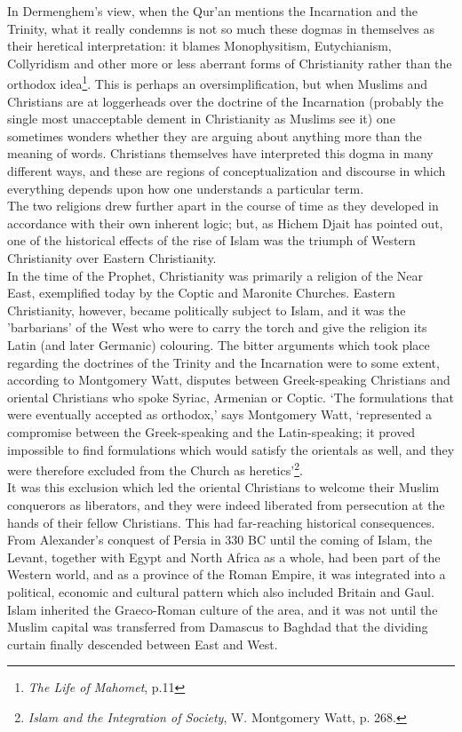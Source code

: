 \documentclass[10pt, twoside,openright]{book}
\begin{document}
In Dermenghem's view, when the Qur'an mentions the Incarnation and the Trinity, what it really 
condemns is not so much these dogmas in themselves as their heretical interpretation: it blames 
Monophysitism, Eutychianism, Collyridism and other more or less aberrant forms of Christianity rather 
than the orthodox idea\footnote{\emph{The Life of Mahomet}, p.11}. This is perhaps an oversimplification, but when Muslims and Christians are at loggerheads over the doctrine of the Incarnation (probably the single most unacceptable dement in Christianity as Muslims see it) one sometimes wonders whether they are arguing about anything more than the meaning of words. Christians themselves have interpreted this dogma in many different ways, and these are regions of conceptualization and discourse in which everything depends upon how one understands a particular term. \\

The two religions drew further apart in the course of time as they developed in accordance with their 
own inherent logic; but, as Hichem Djait has pointed out, one of the historical effects of the rise 
of Islam was the triumph of Western Christianity over Eastern Christianity. \\

In the time of the Prophet, Christianity was primarily a religion of the Near East, exemplified today 
by the Coptic and Maronite Churches. Eastern Christianity, however, became politically subject to 
Islam, and it was the 'barbarians' of the West who were to carry the torch and give the religion its 
Latin (and later Germanic) colouring. The bitter arguments which took place regarding the doctrines 
of the Trinity and the Incarnation were to some extent, according to Montgomery Watt, disputes 
between Greek\hyp{}speaking Christians and oriental Christians who spoke Syriac, Armenian or Coptic. `The formulations that were eventually accepted as orthodox,' says Montgomery Watt, `represented a 
compromise between the Greek\hyp{}speaking and the Latin\hyp{}speaking; it proved impossible to find 
formulations which would satisfy the orientals as well, and they were therefore excluded from the 
Church as heretics'\footnote{\emph{Islam and the Integration of Society}, W. Montgomery Watt, p. 268.}. \\

It was this exclusion which led the oriental Christians to welcome their Muslim conquerors as 
liberators, and they were indeed liberated from persecution at the hands of their fellow Christians. 
This had far\hyp{}reaching historical consequences. From Alexander's conquest of Persia in 330 BC until 
the coming of Islam, the Levant, together with Egypt and North Africa as a whole, had been part of 
the Western world, and as a province of the Roman Empire, it was integrated into a political, 
economic and cultural pattern which also included Britain and Gaul. Islam inherited the Graeco-Roman 
culture of the area, and it was not until the Muslim capital was transferred from Damascus to Baghdad 
that the dividing curtain finally descended between East and West. \\
\end{document}
